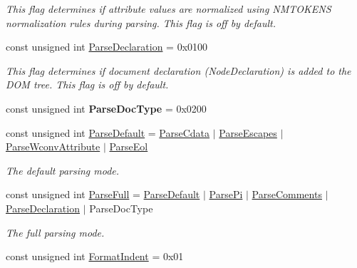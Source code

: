 \begin{DoxyCompactItemize}
\begin{DoxyCompactList}\small\item\em This flag determines if attribute values are normalized using NMTOKENS normalization rules during parsing. This flag is off by default. \item\end{DoxyCompactList}\item 
\hypertarget{namespacephys_1_1xml_a463f15fc43d69ab835c8598826f65646}{
const unsigned int \hyperlink{namespacephys_1_1xml_a463f15fc43d69ab835c8598826f65646}{ParseDeclaration} = 0x0100}
\label{d9/d27/namespacephys_1_1xml_a463f15fc43d69ab835c8598826f65646}

\begin{DoxyCompactList}\small\item\em This flag determines if document declaration (NodeDeclaration) is added to the DOM tree. This flag is off by default. \item\end{DoxyCompactList}\item 
\hypertarget{namespacephys_1_1xml_a37851039450a5fa38ef6b8c717b2e0e6}{
const unsigned int {\bfseries ParseDocType} = 0x0200}
\label{d9/d27/namespacephys_1_1xml_a37851039450a5fa38ef6b8c717b2e0e6}

\item 
const unsigned int \hyperlink{namespacephys_1_1xml_aa6b8f7f8c2322fd683a235b498834d60}{ParseDefault} = \hyperlink{namespacephys_1_1xml_aec00a2a16700dfd76f8f3c776bd000ac}{ParseCdata} $|$ \hyperlink{namespacephys_1_1xml_a6463412ba9e404b6890e4721255cd8ed}{ParseEscapes} $|$ \hyperlink{namespacephys_1_1xml_af9f7575e3cb8a0d8ad9a7ceee5e26983}{ParseWconvAttribute} $|$ \hyperlink{namespacephys_1_1xml_a52af747730d2b3a313eebed4cf49a333}{ParseEol}
\begin{DoxyCompactList}\small\item\em The default parsing mode. \item\end{DoxyCompactList}\item 
const unsigned int \hyperlink{namespacephys_1_1xml_af1c356f1eb063a63efebd6c8a5241c63}{ParseFull} = \hyperlink{namespacephys_1_1xml_aa6b8f7f8c2322fd683a235b498834d60}{ParseDefault} $|$ \hyperlink{namespacephys_1_1xml_a4d324954fc33d50155bae04587da13e2}{ParsePi} $|$ \hyperlink{namespacephys_1_1xml_a83ba30a7bee5a0fd4aa2f6136c8793fc}{ParseComments} $|$ \hyperlink{namespacephys_1_1xml_a463f15fc43d69ab835c8598826f65646}{ParseDeclaration} $|$ ParseDocType
\begin{DoxyCompactList}\small\item\em The full parsing mode. \item\end{DoxyCompactList}\item 
\hypertarget{namespacephys_1_1xml_afaad0b8f59b5f103218ed5cb39b1bbde}{
const unsigned int \hyperlink{namespacephys_1_1xml_afaad0b8f59b5f103218ed5cb39b1bbde}{FormatIndent} = 0x01}
\label{d9/d27/namespacephys_1_1xml_afaad0b8f59b5f103218ed5cb39b1bbde}


\end{DoxyCompactItemize}
